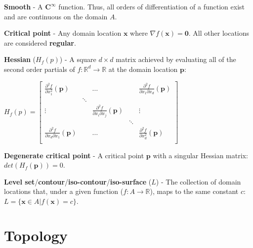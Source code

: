 \begin{defn}
  \textbf{Smooth} - A $\mathbf{C^\infty}$ function. Thus, all orders of
  differentiation of a function exist and are continuous on the domain $A$.
\end{defn}

\begin{defn}
  \textbf{Critical point} - Any domain location $\mathbf{x}$ where $\nabla
  f(\mathbf{x}) = \mathbf{0}$. All other locations are considered
  \textbf{regular}.
\end{defn}

\begin{defn}
  \textbf{Hessian} ($H_f(p)$) - A square $d\times d$ matrix achieved by evaluating
  all of the second order partials of $f : \mathbb{R}^d \rightarrow \mathbb{R}$ at
  the domain location $\mathbf{p}$:

  $H_f(p) =
  \begin{bmatrix}
    \frac{\partial^2f}{\partial x_1^2}(\mathbf{p}) & & \ldots & & \frac{\partial^2f}{\partial x_1\partial x_d}(\mathbf{p}) \\
     & \ddots &  &  & \\
    \vdots &  & \frac{\partial^2f}{\partial x_i\partial x_j}(\mathbf{p}) &  & \vdots \\
     & &  & \ddots & \\
    \frac{\partial^2f}{\partial x_d\partial x_1}(\mathbf{p}) & & \ldots & & \frac{\partial^2f}{\partial x_d^2}(\mathbf{p}) \\
  \end{bmatrix}$
\end{defn}

\begin{defn}
  \textbf{Degenerate critical point} - A critical point $\mathbf{p}$ with a singular Hessian matrix: $det(H_f(\mathbf{p})) = 0$.
\end{defn}

\begin{defn}
 \textbf{Level set}/\textbf{contour}/\textbf{iso-contour}/\textbf{iso-surface}  ($L$) -
 The collection of domain locations that, under a given function ($f : A
 \rightarrow \mathbb{R}$), maps to the same constant $c$: $L = \{\mathbf{x} \in A |
 f(\mathbf{x}) = c\}$.
\end{defn}

\section{Topology}

